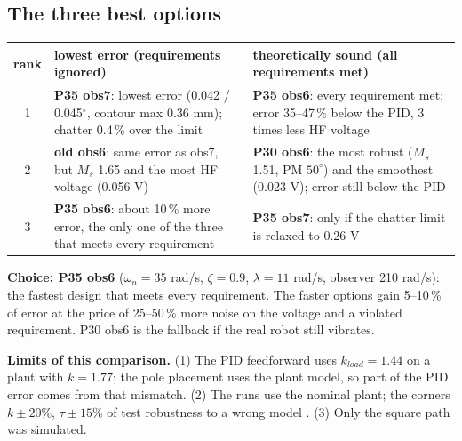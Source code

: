 \documentclass[10pt,a4paper]{article}
\newcommand{\code}[1]{\texttt{\detokenize{#1}}}
\begin{document}
\subsection{The three best options}
\begin{tabularx}{\linewidth}{@{}c X X@{}}
\toprule
rank & \textbf{lowest error} (requirements ignored) & \textbf{theoretically sound} (all requirements met) \\
\midrule
1 & \textbf{P35 obs7}: lowest error (0.042 / 0.045$^\circ$, contour max 0.36 mm); chatter 0.4\,\% over the limit &
    \textbf{P35 obs6}: every requirement met; error 35--47\,\% below the PID, 3 times less HF voltage \\
2 & \textbf{old obs6}: same error as obs7, but $M_s$ 1.65 and the most HF voltage (0.056 V) &
    \textbf{P30 obs6}: the most robust ($M_s$ 1.51, PM $50^\circ$) and the smoothest (0.023 V); error still below the PID \\
3 & \textbf{P35 obs6}: about 10\,\% more error, the only one of the three that meets every requirement &
    \textbf{P35 obs7}: only if the chatter limit is relaxed to 0.26 V \\
\bottomrule
\end{tabularx}

\textbf{Choice: P35 obs6} ($\omega_n=35$ rad/s, $\zeta=0.9$, $\lambda=11$ rad/s, observer 210 rad/s): the fastest design
that meets every requirement. The faster options gain 5--10\,\% of error at the price of 25--50\,\% more noise on the
voltage and a violated requirement. P30 obs6 is the fallback if the real robot still vibrates.

\begin{notebox}
\textbf{Limits of this comparison.} (1) The PID feedforward uses $k_{load}=1.44$ on a plant with $k=1.77$; the pole
placement uses the plant model, so part of the PID error comes from that mismatch. (2) The runs use the nominal plant;
the corners $k\pm20\%$, $\tau\pm15\%$ of \code{observer_study.m} test robustness to a wrong model \cite{Ackermann2002}.
(3) Only the square path was simulated.
\end{notebox}

\end{document}

